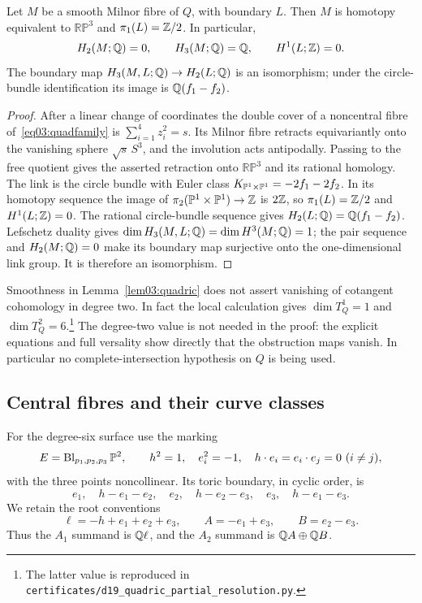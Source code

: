 \begin{lemma}\label{lem03:quadricmilnor}
Let $M$ be a smooth Milnor fibre of $Q$, with boundary $L$.
Then $M$ is homotopy equivalent to $\mathbb{RP}^3$ and
$\pi_1(L)=\mathbb{Z}/2$.  In particular,
\[
 H_2(M;\mathbb{Q})=0,\qquad H_3(M;\mathbb{Q})=\mathbb{Q},\qquad H^1(L;\mathbb{Z})=0.
\]
The boundary map
$H_3(M,L;\mathbb{Q})\to H_2(L;\mathbb{Q})$ is an isomorphism; under the
circle-bundle identification its image is $\mathbb{Q}(f_1-f_2)$.
\end{lemma}

\begin{proof}
After a linear change of coordinates the double cover of a
noncentral fibre of~\eqref{eq03:quadfamily} is
$\sum_{i=1}^4z_i^2=s$.  Its Milnor fibre retracts equivariantly
onto the vanishing sphere $\sqrt{s}\,S^3$, and the involution
acts antipodally.  Passing to the free quotient gives the asserted
retraction onto $\mathbb{RP}^3$ and its rational homology.
The link is the circle bundle with Euler class
$K_{\mathbb{P}^1\times\mathbb{P}^1}=-2f_1-2f_2$.  In its homotopy sequence
the image of $\pi_2(\mathbb{P}^1\times\mathbb{P}^1)\to\mathbb{Z}$ is $2\mathbb{Z}$,
so $\pi_1(L)=\mathbb{Z}/2$ and $H^1(L;\mathbb{Z})=0$.
The rational circle-bundle sequence gives
$H_2(L;\mathbb{Q})=\mathbb{Q}(f_1-f_2)$.  Lefschetz duality gives
$\dim H_3(M,L;\mathbb{Q})=\dim H^3(M;\mathbb{Q})=1$; the pair sequence
and $H_2(M;\mathbb{Q})=0$ make its boundary map surjective onto the
one-dimensional link group.  It is therefore an isomorphism.
\end{proof}

Smoothness in Lemma~\ref{lem03:quadric} does not assert vanishing of
cotangent cohomology in degree two.  In fact the local calculation gives
$\dim T^1_Q=1$ and $\dim T^2_Q=6$.\footnote{The latter value is reproduced in
\texttt{certificates/d19\_quadric\_partial\_resolution.py}.}
The degree-two value is not needed in the proof: the explicit equations
and full versality show directly
that the obstruction maps vanish.  In particular no complete-intersection
hypothesis on $Q$ is being used.

\subsection{Central fibres and their curve classes}

For the degree-six surface use the marking
\[
 E=\operatorname{Bl}_{p_1,p_2,p_3}\mathbb{P}^2,
 \qquad h^2=1,\quad e_i^2=-1,\quad
 h\cdot e_i=e_i\cdot e_j=0\ (i\ne j),
\]
with the three points noncollinear.  Its toric boundary, in cyclic
order, is
\begin{equation}\label{eq03:boundary}
 e_1,\quad h-e_1-e_2,\quad e_2,\quad h-e_2-e_3,
 \quad e_3,\quad h-e_1-e_3.
\end{equation}
We retain the root conventions
\begin{equation}\label{eq03:roots}
 \ell=-h+e_1+e_2+e_3,\qquad
 A=-e_1+e_3,\qquad B=e_2-e_3.
\end{equation}
Thus the $A_1$ summand is $\mathbb{Q}\ell$, and the $A_2$ summand is
$\mathbb{Q} A\oplus\mathbb{Q} B$.

